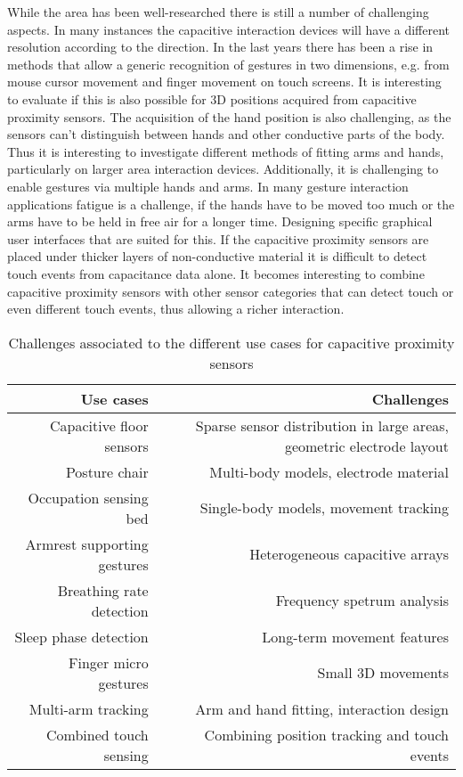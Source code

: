 While the area has been well-researched there is still a number of challenging aspects. In many instances the capacitive interaction devices will have a different resolution according to the direction. In the last years there has been a rise in methods that allow a generic recognition of gestures in two dimensions, e.g. from mouse cursor movement and finger movement on touch screens. It is interesting to evaluate if this is also possible for 3D positions acquired from capacitive proximity sensors. The acquisition of the hand position is also challenging, as the sensors can't distinguish between hands and other conductive parts of the body. Thus it is interesting to investigate different methods of fitting arms and hands, particularly on larger area interaction devices. Additionally, it is challenging to enable gestures via multiple hands and arms. In many gesture interaction applications fatigue is a challenge, if the hands have to be moved too much or the arms have to be held in free air for a longer time. Designing specific graphical user interfaces that are suited for this. If the capacitive proximity sensors are placed under thicker layers of non-conductive material it is difficult to detect touch events from capacitance data alone. It becomes interesting to combine capacitive proximity sensors with other sensor categories that can detect touch or even different touch events, thus allowing a richer interaction. 
\begin{table}[htbp]
  \centering
  \caption{Challenges associated to the different use cases for capacitive proximity sensors}
    \begin{tabular}{rr}
    \toprule
    Use cases & Challenges \\
    \midrule
    Capacitive floor sensors & Sparse sensor distribution in large areas, geometric electrode layout \\
    Posture chair & Multi-body models, electrode material \\
    Occupation sensing bed & Single-body models, movement tracking \\
    Armrest supporting gestures & Heterogeneous capacitive arrays \\
    Breathing rate detection & Frequency spetrum analysis \\
    Sleep phase detection & Long-term movement features \\
    Finger micro gestures & Small 3D movements \\
    Multi-arm tracking & Arm and hand fitting, interaction design \\
    Combined touch sensing & Combining position tracking and touch events \\
    \bottomrule
    \end{tabular}%
  \label{tab:usecase_challenge}%
\end{table}%

